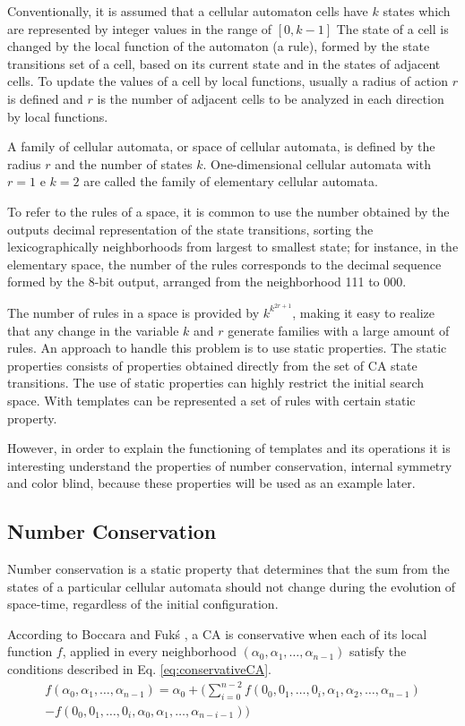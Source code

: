 \documentclass{llncs}
\begin{document}
Conventionally, it is assumed that a cellular automaton cells have $k$ states which are represented by integer values in the range of $[0, k-1]$ The state of a cell is changed by the local function of the automaton (a rule), formed by the state transitions set of a cell, based on its current state and in the states of adjacent cells. To update the values of a cell by local functions, usually a radius of action $r$ is defined and $r$ is the number of adjacent cells to be analyzed in each direction by local functions.

A family of cellular automata, or space of cellular automata, is defined by the radius $r$ and the number of states $k$. One-dimensional cellular automata with $r=1$ e $k=2$ are called the family of elementary cellular automata.

To refer to the rules of a space, it is common to use the number obtained by the outputs decimal representation  of the state transitions, sorting the lexicographically neighborhoods from largest to smallest state; for instance, in the elementary space, the number of the rules corresponds to the decimal sequence formed by the 8-bit output, arranged from the neighborhood 111 to 000.

The number of rules in a space is provided by $k^{k^{2r+1}}$, making it easy to realize that any change in the variable $k$ and $r$ generate families with a large amount of rules. An approach to handle this problem is to use static properties. The static properties consists of properties obtained directly from the set of CA state transitions. The use of static properties can highly restrict the initial search space. With templates can be represented a set of rules with certain static property.

However, in order to explain the functioning of templates and its operations it is interesting understand the properties of number conservation, internal symmetry and color blind, because these properties will be used as an example later.

\subsection{Number Conservation}
Number conservation is a static property that determines that the sum from the states of a particular cellular automata should not change during the evolution of space-time, regardless of the initial configuration.

According to Boccara and Fukś \cite{boccara2002}, a CA is conservative when each of its local function $f$, applied in every neighborhood $(\alpha_0,\alpha_1, \dots, \alpha_{n-1})$ satisfy the conditions described in Eq. \ref{eq:conservativeCA}.
\begin{equation}
\begin{split}
f(\alpha_0,\alpha_1, \dots,\alpha_{n-1}) = \alpha_0 + (\sum_{i=0}^{n-2}f(0_0,0_1, \dots,0_i,\alpha_1,\alpha_2, \dots,\alpha_{n-1}) \\- f(0_0,0_1, \dots,0_i,\alpha_0,\alpha_1, \dots,\alpha_{n-i-1}))
\label{eq:conservativeCA}
\end{split}
\end{equation}
\end{document}
